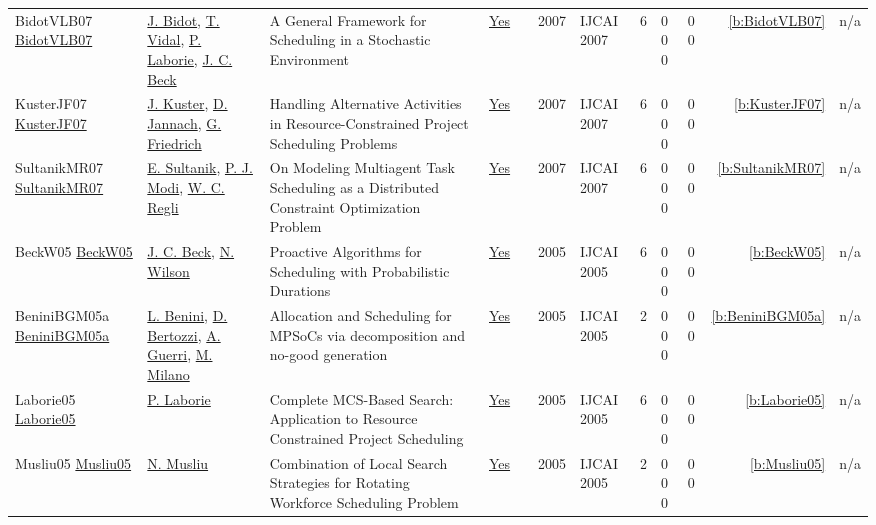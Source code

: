 {\begin{longtable}{>{\raggedright\arraybackslash}p{3cm}>{\raggedright\arraybackslash}p{4.5cm}>{\raggedright\arraybackslash}p{6.0cm}rrrp{2.5cm}rp{1cm}p{1cm}rr}
BidotVLB07 \href{http://ijcai.org/Proceedings/07/Papers/007.pdf}{BidotVLB07} & \hyperref[auth:a824]{J. Bidot}, \hyperref[auth:a825]{T. Vidal}, \hyperref[auth:a118]{P. Laborie}, \hyperref[auth:a89]{J. C. Beck} & A General Framework for Scheduling in a Stochastic Environment & \href{../works/BidotVLB07.pdf}{Yes} & \cite{BidotVLB07} & 2007 & IJCAI 2007 & 6 & 0 0 0 & 0 0 & \ref{b:BidotVLB07} & n/a\\
KusterJF07 \href{http://ijcai.org/Proceedings/07/Papers/316.pdf}{KusterJF07} & \hyperref[auth:a1446]{J. Kuster}, \hyperref[auth:a1447]{D. Jannach}, \hyperref[auth:a602]{G. Friedrich} & Handling Alternative Activities in Resource-Constrained Project Scheduling Problems & \href{../works/KusterJF07.pdf}{Yes} & \cite{KusterJF07} & 2007 & IJCAI 2007 & 6 & 0 0 0 & 0 0 & \ref{b:KusterJF07} & n/a\\
SultanikMR07 \href{http://ijcai.org/Proceedings/07/Papers/247.pdf}{SultanikMR07} & \hyperref[auth:a1443]{E. Sultanik}, \hyperref[auth:a1444]{P. J. Modi}, \hyperref[auth:a1445]{W. C. Regli} & On Modeling Multiagent Task Scheduling as a Distributed Constraint Optimization Problem & \href{../works/SultanikMR07.pdf}{Yes} & \cite{SultanikMR07} & 2007 & IJCAI 2007 & 6 & 0 0 0 & 0 0 & \ref{b:SultanikMR07} & n/a\\
BeckW05 \href{http://ijcai.org/Proceedings/05/Papers/0748.pdf}{BeckW05} & \hyperref[auth:a89]{J. C. Beck}, \hyperref[auth:a826]{N. Wilson} & Proactive Algorithms for Scheduling with Probabilistic Durations & \href{../works/BeckW05.pdf}{Yes} & \cite{BeckW05} & 2005 & IJCAI 2005 & 6 & 0 0 0 & 0 0 & \ref{b:BeckW05} & n/a\\
BeniniBGM05a \href{http://ijcai.org/Proceedings/05/Papers/post-0368.pdf}{BeniniBGM05a} & \hyperref[auth:a245]{L. Benini}, \hyperref[auth:a375]{D. Bertozzi}, \hyperref[auth:a376]{A. Guerri}, \hyperref[auth:a143]{M. Milano} & Allocation and Scheduling for MPSoCs via decomposition and no-good generation & \href{../works/BeniniBGM05a.pdf}{Yes} & \cite{BeniniBGM05a} & 2005 & IJCAI 2005 & 2 & 0 0 0 & 0 0 & \ref{b:BeniniBGM05a} & n/a\\
Laborie05 \href{http://ijcai.org/Proceedings/05/Papers/0571.pdf}{Laborie05} & \hyperref[auth:a118]{P. Laborie} & Complete MCS-Based Search: Application to Resource Constrained Project Scheduling & \href{../works/Laborie05.pdf}{Yes} & \cite{Laborie05} & 2005 & IJCAI 2005 & 6 & 0 0 0 & 0 0 & \ref{b:Laborie05} & n/a\\
Musliu05 \href{http://ijcai.org/Proceedings/05/Papers/post-0448.pdf}{Musliu05} & \hyperref[auth:a45]{N. Musliu} & Combination of Local Search Strategies for Rotating Workforce Scheduling Problem & \href{../works/Musliu05.pdf}{Yes} & \cite{Musliu05} & 2005 & IJCAI 2005 & 2 & 0 0 0 & 0 0 & \ref{b:Musliu05} & n/a\\

\end{longtable}}
